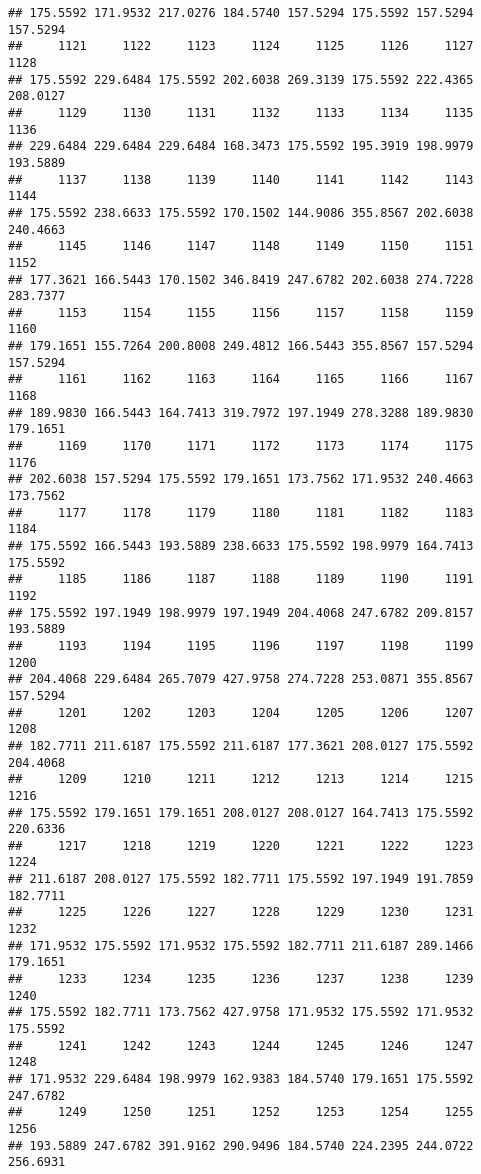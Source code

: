 \documentclass[
]{article}
\begin{document}
\begin{verbatim}
## 175.5592 171.9532 217.0276 184.5740 157.5294 175.5592 157.5294 157.5294 
##     1121     1122     1123     1124     1125     1126     1127     1128 
## 175.5592 229.6484 175.5592 202.6038 269.3139 175.5592 222.4365 208.0127 
##     1129     1130     1131     1132     1133     1134     1135     1136 
## 229.6484 229.6484 229.6484 168.3473 175.5592 195.3919 198.9979 193.5889 
##     1137     1138     1139     1140     1141     1142     1143     1144 
## 175.5592 238.6633 175.5592 170.1502 144.9086 355.8567 202.6038 240.4663 
##     1145     1146     1147     1148     1149     1150     1151     1152 
## 177.3621 166.5443 170.1502 346.8419 247.6782 202.6038 274.7228 283.7377 
##     1153     1154     1155     1156     1157     1158     1159     1160 
## 179.1651 155.7264 200.8008 249.4812 166.5443 355.8567 157.5294 157.5294 
##     1161     1162     1163     1164     1165     1166     1167     1168 
## 189.9830 166.5443 164.7413 319.7972 197.1949 278.3288 189.9830 179.1651 
##     1169     1170     1171     1172     1173     1174     1175     1176 
## 202.6038 157.5294 175.5592 179.1651 173.7562 171.9532 240.4663 173.7562 
##     1177     1178     1179     1180     1181     1182     1183     1184 
## 175.5592 166.5443 193.5889 238.6633 175.5592 198.9979 164.7413 175.5592 
##     1185     1186     1187     1188     1189     1190     1191     1192 
## 175.5592 197.1949 198.9979 197.1949 204.4068 247.6782 209.8157 193.5889 
##     1193     1194     1195     1196     1197     1198     1199     1200 
## 204.4068 229.6484 265.7079 427.9758 274.7228 253.0871 355.8567 157.5294 
##     1201     1202     1203     1204     1205     1206     1207     1208 
## 182.7711 211.6187 175.5592 211.6187 177.3621 208.0127 175.5592 204.4068 
##     1209     1210     1211     1212     1213     1214     1215     1216 
## 175.5592 179.1651 179.1651 208.0127 208.0127 164.7413 175.5592 220.6336 
##     1217     1218     1219     1220     1221     1222     1223     1224 
## 211.6187 208.0127 175.5592 182.7711 175.5592 197.1949 191.7859 182.7711 
##     1225     1226     1227     1228     1229     1230     1231     1232 
## 171.9532 175.5592 171.9532 175.5592 182.7711 211.6187 289.1466 179.1651 
##     1233     1234     1235     1236     1237     1238     1239     1240 
## 175.5592 182.7711 173.7562 427.9758 171.9532 175.5592 171.9532 175.5592 
##     1241     1242     1243     1244     1245     1246     1247     1248 
## 171.9532 229.6484 198.9979 162.9383 184.5740 179.1651 175.5592 247.6782 
##     1249     1250     1251     1252     1253     1254     1255     1256 
## 193.5889 247.6782 391.9162 290.9496 184.5740 224.2395 244.0722 256.6931 

\end{verbatim}
\end{document}
